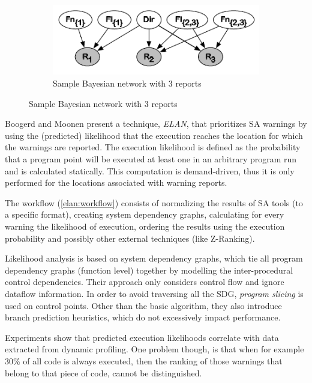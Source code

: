 \documentclass{article}
\begin{document}
\begin{figure}[H]
\begin{subfigure}{.5\textwidth}
     \end{subfigure}%
     \begin{subfigure}{.7\textwidth}
         \centering
         \includegraphics[scale=0.4]{./src/feedback_rank_bayes.png}
         \caption{Sample Bayesian network with 3 reports}\label{fr:bayes}
     \end{subfigure}
 \end{figure}


 Boogerd and Moonen \cite{static_profiling} present a technique, \textit{ELAN}, that prioritizes SA warnings by using the (predicted) likelihood that the execution reaches the location for which the warnings are reported. The execution likelihood is defined as the probability that a program point will be executed at least one in an arbitrary program run and is calculated statically. This computation is demand-driven, thus it is only performed for the locations associated with warning reports.

 The workflow (\cref{elan:workflow}) consists of normalizing the results of SA tools (to a specific format), creating system dependency graphs, calculating for every warning the likelihood of execution, ordering the results using the execution probability and possibly other external techniques (like Z-Ranking). 

 Likelihood analysis is based on system dependency graphs, which tie all program dependency graphs (function level) together by modelling the inter-procedural control dependencies. Their approach only considers control flow and ignore dataflow information. In order to avoid traversing all the SDG, \textit{program slicing} is used on control points. Other than the basic algorithm, they also introduce branch prediction heuristics, which do not excessively impact performance.

 Experiments show that predicted execution likelihoods correlate with data extracted from dynamic profiling. One problem though, is that when for example 30\% of all code is always executed, then the ranking of those warnings that belong to that piece of code, cannot be distinguished.
\end{document}
